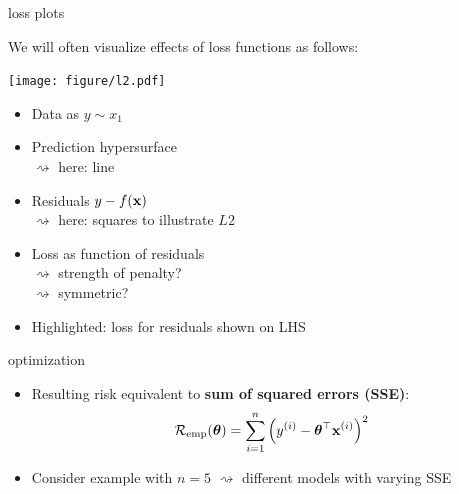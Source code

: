 \documentclass[11pt,compress,t,notes=noshow, xcolor=table]{beamer}
\begin{document}

\begin{frame}{loss plots}

We will often visualize effects of loss functions as follows:

\vfill

\texttt{[image: figure/l2.pdf]}

\hspace{0.5cm}
\begin{minipage}[t]{0.45\textwidth}
    \footnotesize
    \begin{itemize}
        \item Data as $y \sim x_1$
        \item Prediction hypersurface \\$\rightsquigarrow$ here: line
        \item Residuals $y - f(\mathbf{x})$ 
        \\$\rightsquigarrow$ here: squares to illustrate $L2$
    \end{itemize}
\end{minipage}
\hfill
\begin{minipage}[t]{0.4\textwidth}
    \footnotesize
    \begin{itemize}
        \item Loss as function of residuals
        \\$\rightsquigarrow$ strength of penalty? 
        \\$\rightsquigarrow$ symmetric?
        \item Highlighted: loss for residuals shown on LHS
    \end{itemize}
\end{minipage}

\end{frame}


\begin{frame}{optimization}

\begin{itemize}
    \item Resulting risk equivalent to 
    \textbf{sum of squared errors (SSE)}:
    $$\mathcal{R}_{\text{emp}}(\bm{\theta}) = \sum\limits_{i=1}^n \left(y^{(i)} - \bm{\theta}^\top \mathbf{x}^{(i)} \right)^2$$
    \item Consider example with $n = 5$ $\rightsquigarrow$ 
    different models with varying SSE
\end{itemize}

\vfill
{}

\end{frame}
\end{document}
